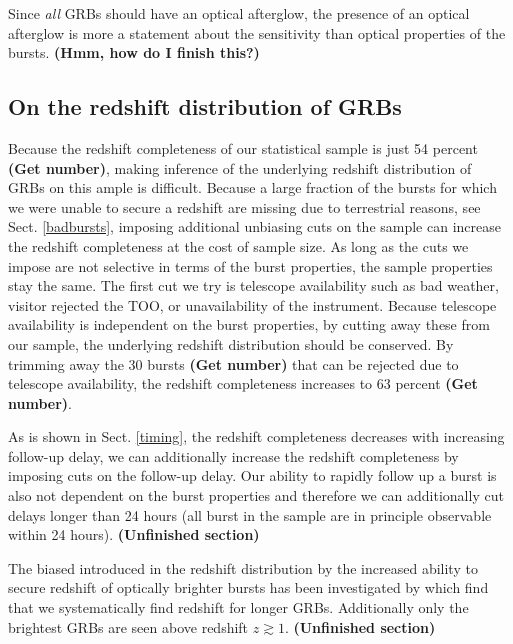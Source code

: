 \documentclass{aa}    %
\newcommand\todo[1]{\textbf{(#1)}}
\begin{document}
Since \textit{all} GRBs should have an optical afterglow, the presence of an optical afterglow is more a statement about the sensitivity than optical properties of the bursts. \todo{Hmm, how do I finish this?}


\subsection{On the redshift distribution of GRBs}

Because the redshift completeness of our statistical sample is just 54 percent
\todo{Get number}, making inference of the underlying redshift distribution of
GRBs on this ample is difficult. Because a large fraction of the bursts for which we were
unable to secure a redshift are missing due to terrestrial reasons, see Sect.
\ref{badbursts}, imposing additional unbiasing cuts on the sample can increase
the redshift completeness at the cost of sample size. As long as the cuts we
impose are not selective in terms of the burst properties, the sample properties
stay the same. The first cut we try is telescope availability such as bad
weather, visitor rejected the TOO, or unavailability of the instrument. Because
telescope availability is independent on the burst properties, by cutting away
these from our sample, the underlying redshift distribution should be conserved.
By trimming away the 30 bursts \todo{Get number} that can be rejected due to
telescope availability, the redshift completeness increases to 63 percent
\todo{Get number}. 

As is shown in Sect. \ref{timing}, the redshift completeness
decreases with increasing follow-up delay, we can additionally increase the
redshift completeness by imposing cuts on the follow-up delay. Our ability to
rapidly follow up a burst is also not dependent on the burst properties and
therefore we can additionally cut delays longer than 24 hours (all burst in the
sample are in principle observable within 24 hours). \todo{Unfinished section}


The biased introduced in the redshift distribution by the increased ability to
secure redshift of optically brighter bursts has been investigated by
\citet{Turpin2016} which find that we systematically find redshift for longer
GRBs. Additionally only the brightest GRBs are seen above redshift $z \gtrsim
1$. \todo{Unfinished section}
\end{document}
